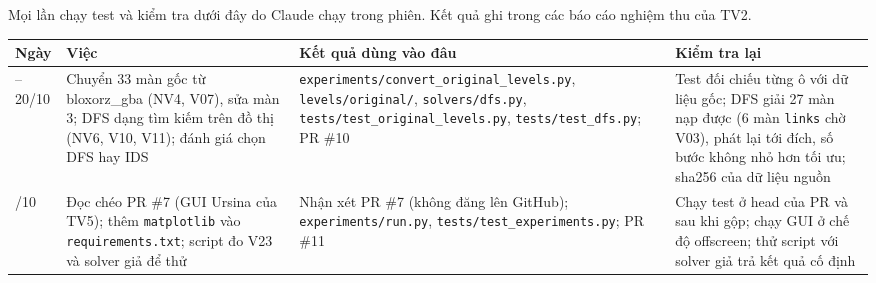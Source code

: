 Mọi lần chạy test và kiểm tra dưới đây do Claude chạy trong phiên. Kết quả ghi trong các báo cáo nghiệm thu của TV2.


{\def\LTcaptype{none} %
\begin{longtable}[]{@{}
  >{\raggedright\arraybackslash}p{}
  >{\raggedright\arraybackslash}p{}
  >{\raggedright\arraybackslash}p{}
  >{\raggedright\arraybackslash}p{}@{}}
\toprule\noalign{}
\rowcolor{tablehead}\begin{minipage}[b]{\linewidth}\raggedright
\textbf{Ngày}
\end{minipage} & \begin{minipage}[b]{\linewidth}\raggedright
\textbf{Việc}
\end{minipage} & \begin{minipage}[b]{\linewidth}\raggedright
\textbf{Kết quả dùng vào đâu}
\end{minipage} & \begin{minipage}[b]{\linewidth}\raggedright
\textbf{Kiểm tra lại}
\end{minipage} \\
\midrule\noalign{}
\endhead
\bottomrule\noalign{}
\endlastfoot
19--20/10 & Chuyển 33 màn gốc từ bloxorz\_gba (NV4, V07), sửa màn 3; DFS dạng tìm kiếm trên đồ thị (NV6, V10, V11); đánh giá chọn DFS hay IDS & \texttt{experiments/\allowbreak{}convert\_\allowbreak{}original\_\allowbreak{}levels.\allowbreak{}py}, \texttt{levels/\allowbreak{}original/\allowbreak{}}, \texttt{solvers/\allowbreak{}dfs.\allowbreak{}py}, \texttt{tests/\allowbreak{}test\_\allowbreak{}original\_\allowbreak{}levels.\allowbreak{}py}, \texttt{tests/\allowbreak{}test\_\allowbreak{}dfs.\allowbreak{}py}; PR \#10 & Test đối chiếu từng ô với dữ liệu gốc; DFS giải 27 màn nạp được (6 màn \texttt{links} chờ V03), phát lại tới đích, số bước không nhỏ hơn tối ưu; sha256 của dữ liệu nguồn \\
\rowrule
23/10 & Đọc chéo PR \#7 (GUI Ursina của TV5); thêm \texttt{matplotlib} vào \texttt{requirements.\allowbreak{}txt}; script đo V23 và solver giả để thử & Nhận xét PR \#7 (không đăng lên GitHub); \texttt{experiments/\allowbreak{}run.\allowbreak{}py}, \texttt{tests/\allowbreak{}test\_\allowbreak{}experiments.\allowbreak{}py}; PR \#11 & Chạy test ở head của PR và sau khi gộp; chạy GUI ở chế độ offscreen; thử script với solver giả trả kết quả cố định \\

\end{longtable}}
